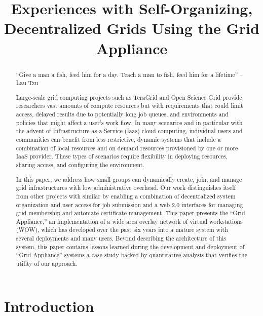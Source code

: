 \documentclass[conference]{IEEEtran}
\begin{document}
\title{Experiences with Self-Organizing, Decentralized Grids Using the Grid
Appliance}

\author{
}

\maketitle


\begin{abstract}

``Give a man a fish, feed him for a day.  Teach a man to fish, feed him for a
lifetime'' -- Lau Tzu

Large-scale grid computing projects such as TeraGrid and Open Science Grid
provide researchers vast amounts of compute resources but with requirements
that could limit access, delayed results due to potentially long job queues,
and environments and policies that might affect a user's work flow. In many
scenarios and in particular with the advent of Infrastructure-as-a-Service
(Iaas) cloud computing, individual users and communities can benefit from less
restrictive, dynamic systems that include a combination of local resources and
on demand resources provisioned by one or more IaaS provider.  These types of
scenarios require flexibility in deploying resources, sharing access, and
configuring the environment.

In this paper, we address how small groups can dynamically create, join, and
manage grid infrastructures with low administrative overhead.  Our work
distinguishes itself from other projects with similar by enabling a combination
of decentralized system organization and user access for job submission and a
web 2.0 interfaces for managing grid membership and automate certificate
management.  This paper presents the ``Grid Appliance,'' an implementation of a
wide area overlay network of virtual workstations (WOW), which has developed
over the past six years into a mature system with several deployments and many
users.  Beyond describing the architecture of this system, this paper contains
lessons learned during the development and deployment of ``Grid Appliance''
systems a case study backed by quantitative analysis that verifies the utility
of our approach.  

\end{abstract}

\section{Introduction}
\end{document}
